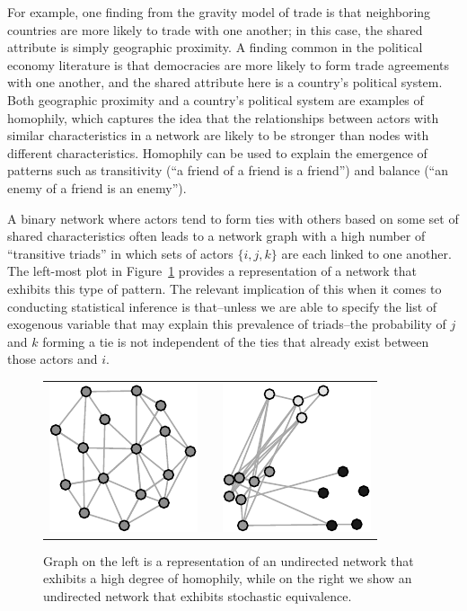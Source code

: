 \documentclass[12pt,twocolumn,twoside]{pnas-new}
\begin{document}
For example, one finding from the gravity model of trade is that neighboring countries are more likely to trade with one another; in this case, the shared attribute is simply geographic proximity. A finding common in the political economy literature is that democracies are more likely to form trade agreements with one another, and the shared attribute here is a country's political system. Both geographic proximity and a country's political system are examples of homophily, which captures the idea that the relationships between actors with similar characteristics in a network are likely to be stronger than nodes with different characteristics. Homophily can be used to explain the emergence of patterns such as transitivity (``a friend of a friend is a friend'') and balance (``an enemy of a friend is an enemy''). 

A binary network where actors tend to form ties with others based on some set of shared characteristics often leads to a network graph with a high number of ``transitive triads'' in which  sets of actors $\{i,j,k\}$ are each linked to one another. The left-most plot in Figure~\ref{fig:homphStochEquivNet} provides a representation of a network that exhibits this type of pattern. The relevant implication of this when it comes to conducting statistical inference is that--unless we are able to specify the list of exogenous variable that may explain this prevalence of triads--the probability of $j$ and $k$ forming a tie is not independent of the ties that already exist between those actors and $i$.

\begin{figure}[ht]
	\centering
	\caption{Graph on the left is a representation of an undirected network that exhibits a high degree of homophily, while on the right we show an undirected network that exhibits stochastic equivalence.}	
	\begin{tabular}{lcr}
	\includegraphics[width=.15\textwidth]{homophNet} & \hspace{1cm} &
	\includegraphics[width=.15\textwidth]{stochEquivNet}
	\end{tabular}
	\label{fig:homphStochEquivNet}
\end{figure}
\end{document}
